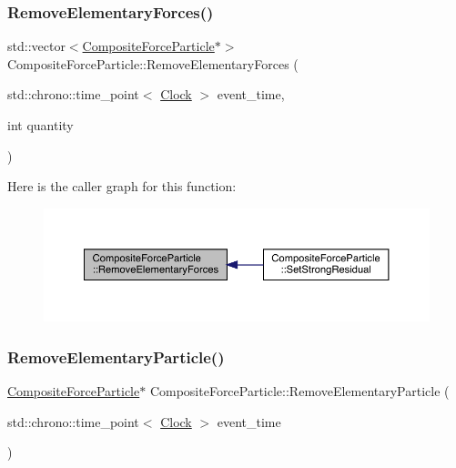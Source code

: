 \subsubsection{\texorpdfstring{Remove\+Elementary\+Forces()}{RemoveElementaryForces()}}
{\footnotesize\ttfamily std\+::vector$<$\hyperlink{class_composite_force_particle}{Composite\+Force\+Particle}$\ast$$>$ Composite\+Force\+Particle\+::\+Remove\+Elementary\+Forces (\begin{DoxyParamCaption}\item[{std\+::chrono\+::time\+\_\+point$<$ \hyperlink{universe_8h_a0ef8d951d1ca5ab3cfaf7ab4c7a6fd80}{Clock} $>$}]{event\+\_\+time,  }\item[{int}]{quantity }\end{DoxyParamCaption})}

Here is the caller graph for this function\+:\nopagebreak
\begin{figure}[H]
\begin{center}
\leavevmode
\includegraphics[width=350pt]{class_composite_force_particle_a1bfa61cec4f5a8436c1a188312ba8f45_icgraph}
\end{center}
\end{figure}
\mbox{\label{class_composite_force_particle_ab63c4a1d5734f1d13806cb9463075a40}} 
\subsubsection{\texorpdfstring{Remove\+Elementary\+Particle()}{RemoveElementaryParticle()}}
{\footnotesize\ttfamily \hyperlink{class_composite_force_particle}{Composite\+Force\+Particle}$\ast$ Composite\+Force\+Particle\+::\+Remove\+Elementary\+Particle (\begin{DoxyParamCaption}\item[{std\+::chrono\+::time\+\_\+point$<$ \hyperlink{universe_8h_a0ef8d951d1ca5ab3cfaf7ab4c7a6fd80}{Clock} $>$}]{event\+\_\+time }\end{DoxyParamCaption})}

